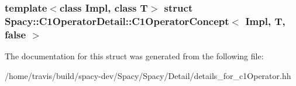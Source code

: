 \subsubsection*{template$<$class Impl, class T$>$ struct Spacy\-::\-C1\-Operator\-Detail\-::\-C1\-Operator\-Concept$<$ Impl, T, false $>$}



\-The documentation for this struct was generated from the following file\-:\begin{DoxyCompactItemize}
\item 
/home/travis/build/spacy-\/dev/\-Spacy/\-Spacy/\-Detail/details\-\_\-for\-\_\-c1\-Operator.\-hh\end{DoxyCompactItemize}
